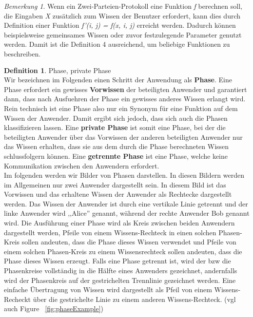 \documentclass{article}
\newcommand{\defined}[1]{{\bf #1}}
\newcommand{\var}[1]{{\em #1}}
\theoremstyle{definition}
\newtheorem{definition}{Definition}
\theoremstyle{remark}
\newtheorem{remark}{Bemerkung}
\begin{document}
\begin{remark}
Wenn ein Zwei-Parteien-Protokoll eine Funktion \var{f} berechnen soll,
die Eingaben \var{X} zus\"atzlich zum Wissen der Benutzer erfordert, 
kann dies durch Definition einer Funktion \var{f'(i, j) = f(x, i, j)}
erreicht werden. Dadurch k\"onnen beispielsweise gemeinsames Wissen oder
zuvor festzulegende Parameter genutzt werden. Damit ist die Definition 4
ausreichend, um beliebige Funktionen zu beschreiben.
\end{remark}

\begin{definition}
Phase, private Phase\\
Wir bezeichnen im Folgenden einen Schritt der Anwendung als \defined{Phase}.
Eine Phase erfordert ein gewisses \defined{Vorwissen} der beteiligten Anwender
und garantiert dann, dass nach Ausfuehren der Phase ein gewisses anderes
Wissen erlangt wird. Rein technisch ist eine Phase also nur ein Synonym f\"ur 
eine Funktion auf dem Wissen der Anwender. Damit ergibt sich jedoch, dass
sich auch die Phasen klassifizieren lassen. Eine \defined{private Phase} ist
somit eine Phase, bei der die beteiligten Anwender \"uber das Vorwissen der
anderen beteiligten Anwender nur das Wissen erhalten, dass sie aus dem 
durch die Phase berechneten Wissen schlussfolgern k\"onnen. Eine
\defined{getrennte Phase} ist eine Phase, welche keine Kommunikation zwischen
den Anwendern erfordert.\\
Im folgenden werden wir Bilder von Phasen darstellen. In diesen Bildern werden
im Allgemeinen nur zwei Anwender dargestellt sein. In diesem Bild ist das
Vorwissen und das erhaltene Wissen der Anwender als Rechtecke dargestellt
werden. Das Wissen der Anwender ist durch eine vertikale Linie getrennt und 
der linke Anwender wird ,,Alice'' genannt, w\"ahrend der rechte Anwender Bob
genannt wird. Die Ausf\"uhrung einer Phase wird als Kreis zwischen beiden 
Anwendern dargestellt werden, Pfeile von einem Wissens-Rechteck in 
einen solchen Phasen-Kreis sollen andeuten, dass die Phase dieses Wissen
verwendet und Pfeile von einem solchen Phasen-Kreis zu einem Wissensrechteck
sollen andeuten, dass die Phase dieses Wissen erzeugt. Falls eine Phase 
getrennt ist, wird der bzw die Phasenkreise vollst\"andig in die H\"alfte eines
Anwenders gezeichnet, andernfalls wird der Phasenkreis auf der gestrichelten
Trennlinie gezeichnet werden. Eine einfache \"Ubertragung von Wissen wird
dargestellt als Pfeil von einem Wissens-Recheckt \"uber die gestrichelte
Linie zu einem anderen Wissens-Rechteck. (vgl auch Figure ~\ref{fig:phaseExample})
\end{definition}
\end{document}
